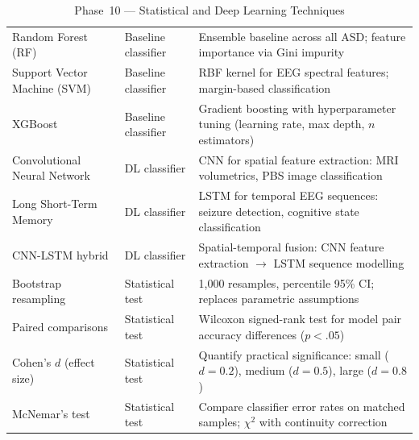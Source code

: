 \begingroup\singlespacing\tablefontsize\tablestripes
\begin{xltabular}{\textwidth}{@{} l l X @{}}
\caption{Phase~10 --- Statistical and Deep Learning Techniques}
\label{tab:phase10_techniques}\\
\toprule
{} &  &  \\
\midrule
\endfirsthead
\endhead
\bottomrule
\endlastfoot
Random Forest (RF)              & Baseline classifier       & Ensemble baseline across all ASD; feature importance via Gini impurity \\
\addlinespace
Support Vector Machine (SVM)    & Baseline classifier       & RBF kernel for EEG spectral features; margin-based classification \\
\addlinespace
XGBoost                         & Baseline classifier       & Gradient boosting with hyperparameter tuning (learning rate, max depth, $n$ estimators) \\
\addlinespace
Convolutional Neural Network    & DL classifier       & CNN for spatial feature extraction: MRI volumetrics, PBS image classification \\
\addlinespace
Long Short-Term Memory          & DL classifier       & LSTM for temporal EEG sequences: seizure detection, cognitive state classification \\
\addlinespace
CNN-LSTM hybrid                 & DL classifier       & Spatial-temporal fusion: CNN feature extraction $\rightarrow$ LSTM sequence modelling \\
\addlinespace
Bootstrap resampling            & Statistical test     & 1,000 resamples, percentile 95\% CI; replaces parametric assumptions \\
\addlinespace
Paired comparisons              & Statistical test     & Wilcoxon signed-rank test for model pair accuracy differences ($p < .05$) \\
\addlinespace
Cohen's $d$ (effect size)       & Statistical test     & Quantify practical significance: small ($d = 0.2$), medium ($d = 0.5$), large ($d = 0.8$) \\
\addlinespace
McNemar's test                  & Statistical test     & Compare classifier error rates on matched samples; $\chi^2$ with continuity correction \\
\end{xltabular}
\endgroup

\vspace{1.5em}

